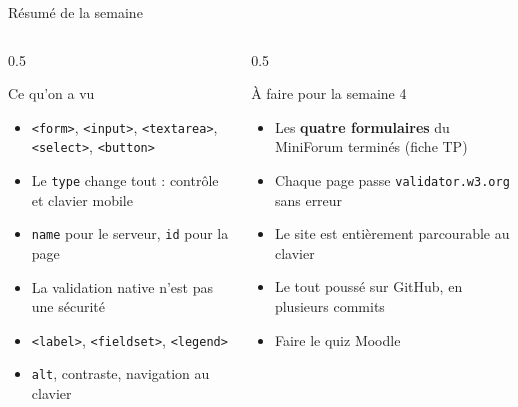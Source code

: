 \documentclass[aspectratio=169,11pt]{beamer}
\begin{document}
\begin{frame}{Résumé de la semaine}
  \begin{columns}[T]
    \begin{column}{0.5\textwidth}
      \begin{block}{Ce qu'on a vu}
        \begin{itemize}
          \item \texttt{<form>}, \texttt{<input>}, \texttt{<textarea>}, \texttt{<select>}, \texttt{<button>}
          \item Le \texttt{type} change tout : contrôle et clavier mobile
          \item \texttt{name} pour le serveur, \texttt{id} pour la page
          \item La validation native n'est pas une sécurité
          \item \texttt{<label>}, \texttt{<fieldset>}, \texttt{<legend>}
          \item \texttt{alt}, contraste, navigation au clavier
        \end{itemize}
      \end{block}
    \end{column}
    \begin{column}{0.5\textwidth}
      \begin{alertblock}{À faire pour la semaine 4}
        \begin{itemize}
          \item Les \textbf{quatre formulaires} du MiniForum terminés (fiche TP)
          \item Chaque page passe \texttt{validator.w3.org} sans erreur
          \item Le site est entièrement parcourable au clavier
          \item Le tout poussé sur GitHub, en plusieurs commits
          \item Faire le quiz Moodle
        \end{itemize}
      \end{alertblock}
    \end{column}
  \end{columns}
\end{frame}
\end{document}
